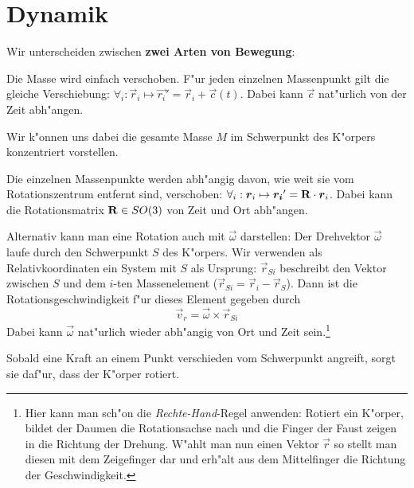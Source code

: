 \section{Dynamik}
\label{kap_dynamik}

Wir unterscheiden zwischen \textbf{zwei Arten von Bewegung}:
\begin{description}[\setlabelstyle{\bfseries\slshape}]
\item[\index{Translation}Translation] Die Masse wird einfach
   verschoben. F"ur jeden einzelnen Massenpunkt gilt die gleiche
   Verschiebung: $\forall_i: \vec r_i \mapsto \vec{r_i}' = \vec r_i +
   \vec c(t)$. Dabei kann $\vec c$ nat"urlich von der Zeit abh"angen.

   Wir k"onnen uns dabei die gesamte Masse $M$ im Schwerpunkt des
   K"orpers konzentriert vorstellen.
\item[\index{Rotation}Rotation] Die einzelnen Massenpunkte werden
   abh"angig davon, wie weit sie vom Rotationszentrum entfernt sind,
   verschoben: $\forall_i: \boldsymbol{r}_i \mapsto \boldsymbol{r_i}' = \mathbf{R} \cdot
   \boldsymbol{r}_i$. Dabei kann die Rotationsmatrix $\mathbf{R} \in SO(3)$ von
   Zeit und Ort abh"angen.

Alternativ kann man eine Rotation auch mit $\vec \omega$ darstellen:
Der Drehvektor $\vec \omega$ laufe durch den Schwerpunkt $S$ des
K"orpers. Wir verwenden als Relativkoordinaten ein System mit $S$ als
Ursprung: $\vec r_{Si}$ beschreibt den Vektor zwischen $S$ und dem
$i$-ten Massenelement ($\vec r_{Si} = \vec r_i - \vec r_S$). Dann ist
die Rotationsgeschwindigkeit f"ur dieses Element gegeben durch
\begin{equation}
   \label{eqn_rotationsgeschwindigkeit}
   \vec v_r = \vec \omega \times \vec r_{Si}
\end{equation}
Dabei kann $\vec \omega$ nat"urlich wieder abh"angig von Ort und Zeit
sein.\footnote{Hier kann man sch"on die \emph{Rechte-Hand}-Regel
  anwenden: Rotiert ein K"orper, bildet der Daumen die Rotationsachse
  nach und die Finger der Faust zeigen in die Richtung der
  Drehung. W"ahlt man nun einen Vektor $\vec r$ so stellt man diesen
  mit dem Zeigefinger dar und erh"alt aus dem Mittelfinger die Richtung
  der Geschwindigkeit.}
\end{description}


\begin{Wichtig}
   Sobald eine Kraft an einem Punkt verschieden vom Schwerpunkt
   angreift, sorgt sie daf"ur, dass der K"orper rotiert.
\end{Wichtig}





